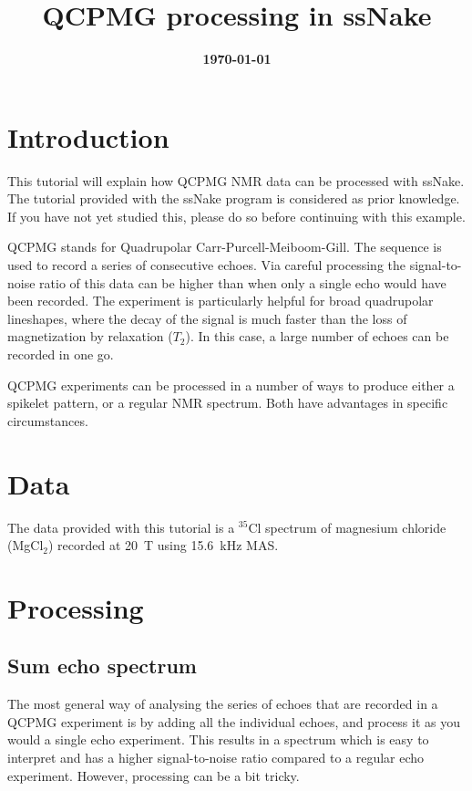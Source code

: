 \documentclass[11pt,a4paper]{article}
\title{\color{black}\fontfamily{SourceSansPro-LF}\bfseries QCPMG processing in ssNake}
\author{}
\date{\color{black}\fontfamily{SourceSansPro-LF}\bfseries \today}
\begin{document}

\maketitle

\section{Introduction}
This tutorial will explain how QCPMG NMR data can be processed with ssNake.
The tutorial provided with the ssNake program is considered as prior knowledge.
If you have not yet studied this, please do so before continuing with this example.

QCPMG stands for Quadrupolar Carr-Purcell-Meiboom-Gill.
The sequence is used to record a series of consecutive echoes.
Via careful processing the signal-to-noise ratio of this data can be higher than when only a single echo would have been recorded.
The experiment is particularly helpful for broad quadrupolar lineshapes, where the decay of the signal is much faster than the loss of magnetization by relaxation ($T_2$).
In this case, a large number of echoes can be recorded in one go.

QCPMG experiments can be processed in a number of ways to produce either a spikelet pattern, or a regular NMR spectrum.
Both have advantages in specific circumstances.


\section{Data}
The data provided with this tutorial is a $^{35}$Cl spectrum of magnesium chloride (MgCl$_2$) recorded at 20~T using 15.6~kHz MAS.


\section{Processing}
\subsection{Sum echo spectrum}
The most general way of analysing the series of echoes that are recorded in a QCPMG experiment is by adding all the individual echoes, and process it as you would a single echo experiment.
This results in a spectrum which is easy to interpret and has a higher signal-to-noise ratio compared to a regular echo experiment.
However, processing can be a bit tricky.
\end{document}
